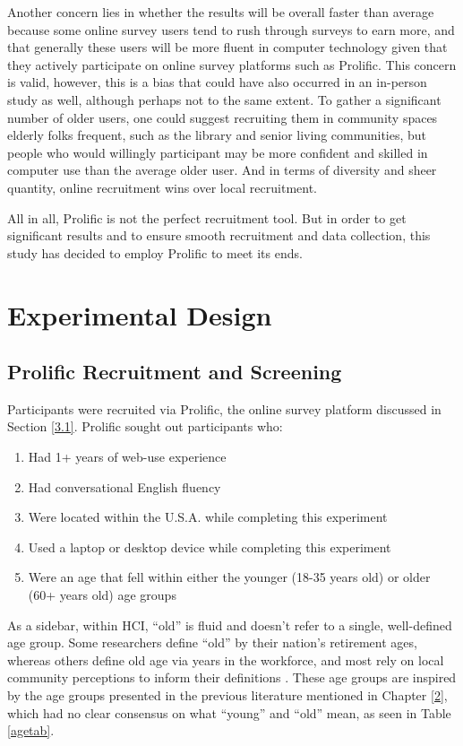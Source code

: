 \documentclass[12pt,twoside]{reedthesis}
\begin{document}
    Another concern lies in whether the results will be overall faster than average because some online survey users tend to rush through surveys to earn more, and that generally these users will be more fluent in computer technology given that they actively participate on online survey platforms such as Prolific. This concern is valid, however, this is a bias that could have also occurred in an in-person study as well, although perhaps not to the same extent. To gather a significant number of older users, one could suggest recruiting them in community spaces elderly folks frequent, such as the library and senior living communities, but people who would willingly participant may be more confident and skilled in computer use than the average older user. And in terms of diversity and sheer quantity, online recruitment wins over local recruitment. 

    All in all, Prolific is not the perfect recruitment tool. But in order to get significant results and to ensure smooth recruitment and data collection, this study has decided to employ Prolific to meet its ends.

\section{Experimental Design}\label{3.2}

\subsection{Prolific Recruitment and Screening}\label{3.2.1}
    Participants were recruited via Prolific, the online survey platform discussed in Section \ref{3.1}. Prolific sought out participants who: 
    \begin{enumerate}
        \item Had 1+ years of web-use experience
        \item Had conversational English fluency
        \item Were located within the U.S.A. while completing this experiment
        \item Used a laptop or desktop device while completing this experiment
        \item Were an age that fell within either the younger (18-35 years old) or older (60+ years old) age groups
    \end{enumerate}
    
    As a sidebar, within HCI, \enquote{old} is fluid and doesn't refer to a single, well-defined age group. Some researchers define \enquote{old} by their nation's retirement ages, whereas others define old age via years in the workforce, and most rely on local community perceptions to inform their definitions \cite{yu_reducing_2024}. These age groups are inspired by the age groups presented in the previous literature mentioned in Chapter \ref{2}, which had no clear consensus on what \enquote{young} and \enquote{old} mean, as seen in Table \ref{agetab}. 
\end{document}
